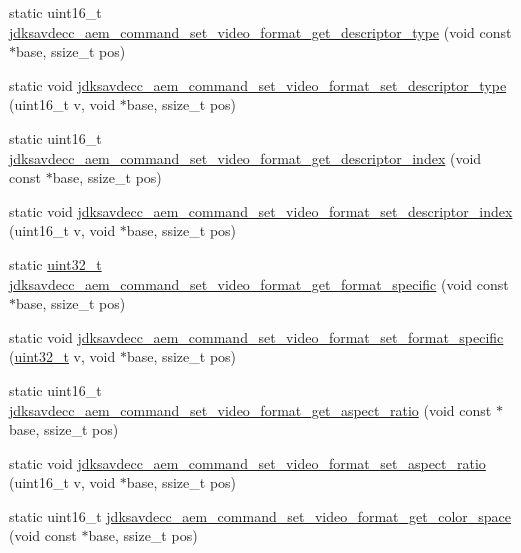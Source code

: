 \begin{DoxyCompactItemize}
\item 
static uint16\+\_\+t \hyperlink{group__command__set__video__format_ga983440a8fd05f5e141c68beb1c5269d7}{jdksavdecc\+\_\+aem\+\_\+command\+\_\+set\+\_\+video\+\_\+format\+\_\+get\+\_\+descriptor\+\_\+type} (void const $\ast$base, ssize\+\_\+t pos)
\item 
static void \hyperlink{group__command__set__video__format_ga63223d9aefa046a427bff377771d82ed}{jdksavdecc\+\_\+aem\+\_\+command\+\_\+set\+\_\+video\+\_\+format\+\_\+set\+\_\+descriptor\+\_\+type} (uint16\+\_\+t v, void $\ast$base, ssize\+\_\+t pos)
\item 
static uint16\+\_\+t \hyperlink{group__command__set__video__format_ga45e769607c8f42b7f0755c8e73255b5b}{jdksavdecc\+\_\+aem\+\_\+command\+\_\+set\+\_\+video\+\_\+format\+\_\+get\+\_\+descriptor\+\_\+index} (void const $\ast$base, ssize\+\_\+t pos)
\item 
static void \hyperlink{group__command__set__video__format_gaf4d23f3fb836062a472104a05a8f84e7}{jdksavdecc\+\_\+aem\+\_\+command\+\_\+set\+\_\+video\+\_\+format\+\_\+set\+\_\+descriptor\+\_\+index} (uint16\+\_\+t v, void $\ast$base, ssize\+\_\+t pos)
\item 
static \hyperlink{parse_8c_a6eb1e68cc391dd753bc8ce896dbb8315}{uint32\+\_\+t} \hyperlink{group__command__set__video__format_ga59898adde209c53001ee2bb4b00a7907}{jdksavdecc\+\_\+aem\+\_\+command\+\_\+set\+\_\+video\+\_\+format\+\_\+get\+\_\+format\+\_\+specific} (void const $\ast$base, ssize\+\_\+t pos)
\item 
static void \hyperlink{group__command__set__video__format_gae47ba3aa6142be24f1d1e1f12a873511}{jdksavdecc\+\_\+aem\+\_\+command\+\_\+set\+\_\+video\+\_\+format\+\_\+set\+\_\+format\+\_\+specific} (\hyperlink{parse_8c_a6eb1e68cc391dd753bc8ce896dbb8315}{uint32\+\_\+t} v, void $\ast$base, ssize\+\_\+t pos)
\item 
static uint16\+\_\+t \hyperlink{group__command__set__video__format_ga747c3dc808e77c1c21b3242387569d2b}{jdksavdecc\+\_\+aem\+\_\+command\+\_\+set\+\_\+video\+\_\+format\+\_\+get\+\_\+aspect\+\_\+ratio} (void const $\ast$base, ssize\+\_\+t pos)
\item 
static void \hyperlink{group__command__set__video__format_gae414cf58ef2f52f04066808b2f24d345}{jdksavdecc\+\_\+aem\+\_\+command\+\_\+set\+\_\+video\+\_\+format\+\_\+set\+\_\+aspect\+\_\+ratio} (uint16\+\_\+t v, void $\ast$base, ssize\+\_\+t pos)
\item 
static uint16\+\_\+t \hyperlink{group__command__set__video__format_ga138c281f1cf75b478af2d0b29c3b6713}{jdksavdecc\+\_\+aem\+\_\+command\+\_\+set\+\_\+video\+\_\+format\+\_\+get\+\_\+color\+\_\+space} (void const $\ast$base, ssize\+\_\+t pos)

\end{DoxyCompactItemize}
